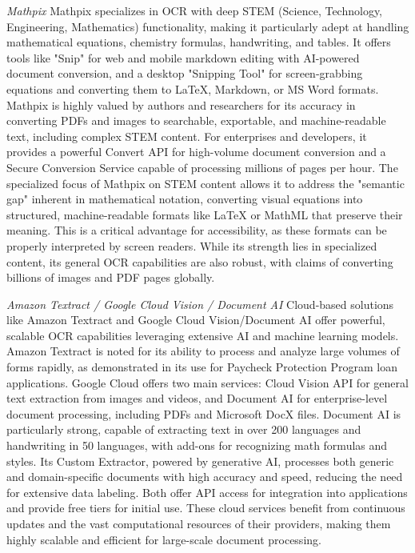 \emph{Mathpix}
Mathpix specializes in OCR with deep STEM (Science, Technology, Engineering, Mathematics) functionality, making it particularly adept at handling mathematical equations, chemistry formulas, handwriting, and tables. \cite{Mathpix} It offers tools like "Snip" for web and mobile markdown editing with AI-powered document conversion, and a desktop "Snipping Tool" for screen-grabbing equations and converting them to LaTeX, Markdown, or MS Word formats. \cite{Mathpix} Mathpix is highly valued by authors and researchers for its accuracy in converting PDFs and images to searchable, exportable, and machine-readable text, including complex STEM content. \cite{Mathpix} For enterprises and developers, it provides a powerful Convert API for high-volume document conversion and a Secure Conversion Service capable of processing millions of pages per hour. \cite{Mathpix} The specialized focus of Mathpix on STEM content allows it to address the "semantic gap" inherent in mathematical notation, converting visual equations into structured, machine-readable formats like LaTeX or MathML that preserve their meaning. This is a critical advantage for accessibility, as these formats can be properly interpreted by screen readers. \cite{TPGIMathAccessible} While its strength lies in specialized content, its general OCR capabilities are also robust, with claims of converting billions of images and PDF pages globally. \cite{Mathpix}

\emph{Amazon Textract / Google Cloud Vision / Document AI}
Cloud-based solutions like Amazon Textract and Google Cloud Vision/Document AI offer powerful, scalable OCR capabilities leveraging extensive AI and machine learning models. Amazon Textract is noted for its ability to process and analyze large volumes of forms rapidly, as demonstrated in its use for Paycheck Protection Program loan applications. \cite{AWSOCR} Google Cloud offers two main services: Cloud Vision API for general text extraction from images and videos, and Document AI for enterprise-level document processing, including PDFs and Microsoft DocX files. \cite{CloudGoogleOCR} Document AI is particularly strong, capable of extracting text in over 200 languages and handwriting in 50 languages, with add-ons for recognizing math formulas and styles. \cite{CloudGoogleOCR} Its Custom Extractor, powered by generative AI, processes both generic and domain-specific documents with high accuracy and speed, reducing the need for extensive data labeling. \cite{CloudGoogleOCR} Both offer API access for integration into applications and provide free tiers for initial use. \cite{CloudGoogleOCR} These cloud services benefit from continuous updates and the vast computational resources of their providers, making them highly scalable and efficient for large-scale document processing.

